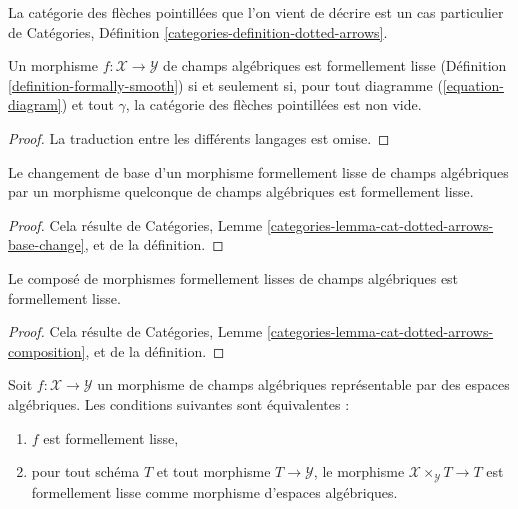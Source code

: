 \medskip\noindent
La catégorie des flèches pointillées que l'on vient de décrire est un cas particulier de
Catégories, Définition \ref{categories-definition-dotted-arrows}.

\begin{lemma}
\label{lemma-reformulate-formal-smoothness}
Un morphisme $f : \mathcal{X} \to \mathcal{Y}$ de champs algébriques est
formellement lisse (Définition \ref{definition-formally-smooth})
si et seulement si, pour tout diagramme (\ref{equation-diagram}) et tout $\gamma$,
la catégorie des flèches pointillées est non vide.
\end{lemma}

\begin{proof}
La traduction entre les différents langages est omise.
\end{proof}

\begin{lemma}
\label{lemma-base-change-formal-smoothness}
Le changement de base d'un morphisme formellement lisse de champs algébriques
par un morphisme quelconque de champs algébriques est formellement lisse.
\end{lemma}

\begin{proof}
Cela résulte de
Catégories, Lemme \ref{categories-lemma-cat-dotted-arrows-base-change},
et de la définition.
\end{proof}

\begin{lemma}
\label{lemma-composition-formal-smoothness}
Le composé de morphismes formellement lisses de champs algébriques
est formellement lisse.
\end{lemma}

\begin{proof}
Cela résulte de
Catégories, Lemme \ref{categories-lemma-cat-dotted-arrows-composition},
et de la définition.
\end{proof}

\begin{lemma}
\label{lemma-formal-smoothness-representable}
Soit $f : \mathcal{X} \to \mathcal{Y}$ un morphisme de champs algébriques
représentable par des espaces algébriques. Les conditions suivantes sont équivalentes :
\begin{enumerate}
\item $f$ est formellement lisse,
\item pour tout schéma $T$ et tout morphisme $T \to \mathcal{Y}$,
le morphisme $\mathcal{X} \times_\mathcal{Y} T \to T$
est formellement lisse comme morphisme d'espaces algébriques.
\end{enumerate}
\end{lemma}


